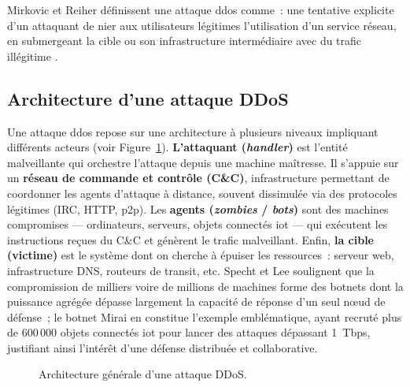 Mirkovic et Reiher définissent une attaque \gls{ddos} comme~: \og une tentative explicite d'un attaquant de nier aux utilisateurs légitimes l'utilisation d'un service réseau, en submergeant la cible ou son infrastructure intermédiaire avec du trafic illégitime \fg{} \parencite{mirkovic2005dward}.


\subsection{Architecture d'une attaque DDoS}

Une attaque \gls{ddos} repose sur une architecture à plusieurs niveaux impliquant différents acteurs (voir Figure~\ref{fig:ddos_archi}). \textbf{L'attaquant (\textit{handler})} est l'entité malveillante qui orchestre l'attaque depuis une machine maîtresse. Il s'appuie sur un \textbf{réseau de commande et contrôle (C\&C)}, infrastructure permettant de coordonner les agents d'attaque à distance, souvent dissimulée via des protocoles légitimes (IRC, HTTP, \gls{p2p}). Les \textbf{agents (\textit{zombies} / \textit{bots})} sont des machines compromises --- ordinateurs, serveurs, objets connectés \gls{iot} --- qui exécutent les instructions reçues du C\&C et génèrent le trafic malveillant. Enfin, \textbf{la cible (victime)} est le système dont on cherche à épuiser les ressources~: serveur web, infrastructure DNS, routeurs de transit, etc. Specht et Lee \parencite{specht2004ddos} soulignent que la compromission de milliers voire de millions de machines forme des botnets dont la puissance agrégée dépasse largement la capacité de réponse d'un seul n\oe{}ud de défense~; le botnet Mirai \parencite{antonakakis2017mirai} en constitue l'exemple emblématique, ayant recruté plus de 600\,000 objets connectés \gls{iot} pour lancer des attaques dépassant 1~Tbps, justifiant ainsi l'intérêt d'une défense distribuée et collaborative.

\begin{figure}[H]
\centering
{}
\caption{Architecture générale d'une attaque DDoS.}
\label{fig:ddos_archi}
\end{figure}

